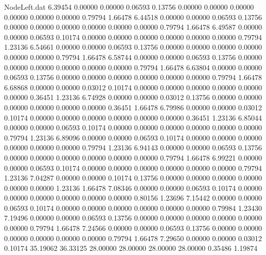\begin{filecontents}{NodeLeft.dat}
   6.39454    0.00000    0.00000     0.06593    0.13756    0.00000    0.00000    0.00000    0.00000    0.00000    0.00000    0.79794    1.66478
   6.44518    0.00000    0.00000     0.06593    0.13756    0.00000    0.00000    0.00000    0.00000    0.00000    0.00000    0.79794    1.66478
   6.49587    0.00000    0.00000     0.06593    0.10174    0.00000    0.00000    0.00000    0.00000    0.00000    0.00000    0.79794    1.23136
   6.54661    0.00000    0.00000     0.06593    0.13756    0.00000    0.00000    0.00000    0.00000    0.00000    0.00000    0.79794    1.66478
   6.58744    0.00000    0.00000     0.06593    0.13756    0.00000    0.00000    0.00000    0.00000    0.00000    0.00000    0.79794    1.66478
   6.63804    0.00000    0.00000     0.06593    0.13756    0.00000    0.00000    0.00000    0.00000    0.00000    0.00000    0.79794    1.66478
   6.68868    0.00000    0.00000     0.03012    0.10174    0.00000    0.00000    0.00000    0.00000    0.00000    0.00000    0.36451    1.23136
   6.74928    0.00000    0.00000     0.03012    0.13756    0.00000    0.00000    0.00000    0.00000    0.00000    0.00000    0.36451    1.66478
   6.79986    0.00000    0.00000     0.03012    0.10174    0.00000    0.00000    0.00000    0.00000    0.00000    0.00000    0.36451    1.23136
   6.85044    0.00000    0.00000     0.06593    0.10174    0.00000    0.00000    0.00000    0.00000    0.00000    0.00000    0.79794    1.23136
   6.89096    0.00000    0.00000     0.06593    0.10174    0.00000    0.00000    0.00000    0.00000    0.00000    0.00000    0.79794    1.23136
   6.94143    0.00000    0.00000     0.06593    0.13756    0.00000    0.00000    0.00000    0.00000    0.00000    0.00000    0.79794    1.66478
   6.99221    0.00000    0.00000     0.06593    0.10174    0.00000    0.00000    0.00000    0.00000    0.00000    0.00000    0.79794    1.23136
   7.04287    0.00000    0.00000     0.10174    0.13756    0.00000    0.00000    0.00000    0.00000    0.00000    0.00000    1.23136    1.66478
   7.08346    0.00000    0.00000     0.06593    0.10174    0.00000    0.00000    0.00000    0.00000    0.00000    0.00000    0.80156    1.23696
   7.15442    0.00000    0.00000     0.06593    0.10174    0.00000    0.00000    0.00000    0.00000    0.00000    0.00000    0.79984    1.23430
   7.19496    0.00000    0.00000     0.06593    0.13756    0.00000    0.00000    0.00000    0.00000    0.00000    0.00000    0.79794    1.66478
   7.24566    0.00000    0.00000     0.06593    0.13756    0.00000    0.00000    0.00000    0.00000    0.00000    0.00000    0.79794    1.66478
   7.29650    0.00000    0.00000     0.03012    0.10174   35.19062   36.33125   28.00000   28.00000   28.00000   28.00000    0.35486    1.19874

\end{filecontents}
